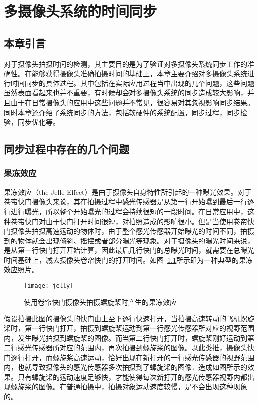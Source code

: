 

\chapter{多摄像头系统的时间同步}

\section{本章引言}

对于摄像头拍摄时间的检测，其主要目的是为了验证对多摄像头系统同步工作的准确性。在能够获得摄像头准确拍摄时间的基础上，本章主要介绍对多摄像头系统进行时间同步的具体过程。其中包括在实际应用过程当中出现的几个问题，这些问题虽然表面看起来也并不重要，有时候却会对多摄像头系统的同步造成较大影响，并且由于在日常摄像头的应用中这些问题并不常见，很容易对其忽视影响同步结果。同时本章还介绍了系统同步的方法，包括软硬件的系统配置，同步过程，同步检验，同步优化等。

\section{同步过程中存在的几个问题}

\subsection{果冻效应}

果冻效应（the Jello Effect）是由于摄像头自身特性所引起的一种曝光效果。对于卷帘快门摄像头来说，其在拍摄过程中感光传感器是从第一行开始曝到最后一行逐行进行曝光，所以整个开始曝光的过程会持续很短的一段时间。在日常应用中，这种卷帘快门对由于快门打开时间很短，对拍照造成的影响很小。但是当使用卷帘快门摄像头拍摄高速运动的物体时，由于整个感光传感器开始曝光的时间不同，拍摄到的物体就会出现倾斜、摇摆或者部分曝光等现象。对于摄像头的曝光时间来说，是从第一行快门打开开始计算，因此最后几行快门的总曝光时间，就需要在总曝光时间基础上，减去摄像头卷帘快门的打开时间。如图~\ref{jelly}所示即为一种典型的果冻效应照片。

\begin{figure}[h] 
  \centering
  \texttt{[image: jelly]}
  \caption{使用卷帘快门摄像头拍摄螺旋桨时产生的果冻效应}
  \label{jelly}
\end{figure}

假设拍摄此图的摄像头的快门由上至下逐行快速打开，当拍摄高速转动的飞机螺旋桨时，第一行快门打开，拍摄到螺旋桨运动到第一行感光传感器所对应的视野范围内，发生曝光拍摄到螺旋桨的图像。而当第二行快门打开时，螺旋桨刚好运动到第二行感光传感器所对应的范围内，再次拍摄到螺旋桨的图像。以此类推，摄像头快门逐行打开，而螺旋桨高速运动，恰好出现在新打开的一行感光传感器的视野范围内，也就导致摄像头的感光传感器多次拍摄到了螺旋桨的图像，造成如图所示的效果。只有螺旋桨的运动速度足够快，才能使得每次新打开的感光传感器视野内都出现螺旋桨的图像。在普通拍摄中，拍摄对象运动速度较慢，是不会出现这种现象的。

